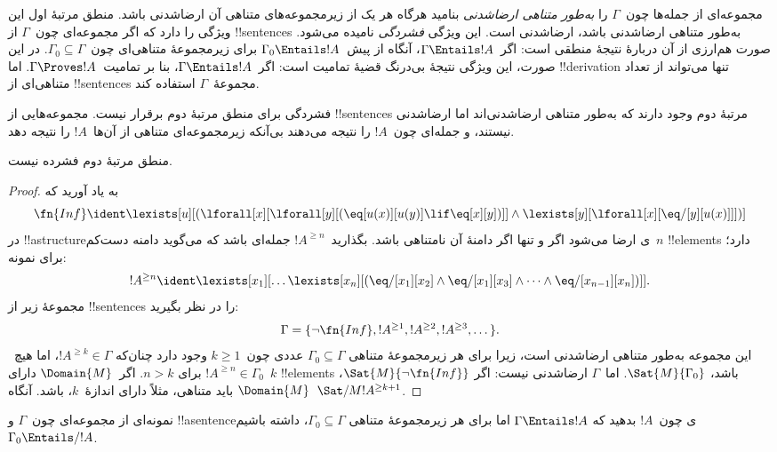 \documentclass[../../../include/open-logic-section]{subfiles}
\begin{document}


\begin{explain}
مجموعه‌ای از جمله‌ها چون~$\Gamma$ را \emph{به‌طور متناهی ارضاشدنی}
بنامید هرگاه هر یک از زیرمجموعه‌های متناهی آن ارضاشدنی باشد. منطق مرتبهٔ
اول این ویژگی را دارد که اگر مجموعه‌ای چون~$\Gamma$ از !!{sentence}s
به‌طور متناهی ارضاشدنی باشد، ارضاشدنی است. این ویژگی
\emph{فشردگی} نامیده می‌شود. صورت هم‌ارزی از آن دربارهٔ نتیجهٔ منطقی
است: اگر~$\Gamma \Entails !A$، آنگاه از پیش~$\Gamma_0 \Entails !A$ برای
زیرمجموعهٔ متناهی‌ای چون~$\Gamma_0 \subseteq \Gamma$. در این صورت،
این ویژگی نتیجهٔ بی‌درنگ قضیهٔ تمامیت است: اگر~$\Gamma \Entails !A$،
بنا بر تمامیت~$\Gamma \Proves !A$. اما !!{derivation} تنها می‌تواند از
تعداد متناهی‌ای از !!{sentence}s مجموعهٔ~$\Gamma$ استفاده کند.

فشردگی برای منطق مرتبهٔ دوم برقرار نیست. مجموعه‌هایی از !!{sentence}s
مرتبهٔ دوم وجود دارند که به‌طور متناهی ارضاشدنی‌اند اما ارضاشدنی نیستند،
و جمله‌ای چون~$!A$ را نتیجه می‌دهند بی‌آنکه زیرمجموعه‌ای متناهی
از آن‌ها~$!A$ را نتیجه دهد.
\end{explain}


\begin{thm}
منطق مرتبهٔ دوم فشرده نیست.
\end{thm}

\begin{proof}
به یاد آورید که
\[
\fn{Inf} \ident \lexists[u][(\lforall[x][\lforall[y][(\eq[u(x)][u(y)]
      \lif \eq[x][y])]] \land \lexists[y][\lforall[x][\eq/[y][u(x)]]])]
\]
در !!a{structure}ی ارضا می‌شود اگر و تنها اگر دامنهٔ آن نامتناهی باشد.
بگذارید~$!A^{\ge n}$ جمله‌ای باشد که می‌گوید دامنه دست‌کم~$n$
!!{element}s دارد؛ برای نمونه:
\[
!A^{\ge n} \ident \lexists[x_1][\dots\lexists[x_n][(\eq/[x_1][x_2]
    \land \eq/[x_1][x_3] \land \dots \land \eq/[x_{n-1}][x_n])]].
\]
مجموعهٔ زیر از !!{sentence}s را در نظر بگیرید:
\[
\Gamma = \{\lnot \fn{Inf}, !A^{\ge 1}, !A^{\ge 2}, !A^{\ge 3}, \dots\}.
\]
این مجموعه به‌طور متناهی ارضاشدنی است، زیرا برای هر زیرمجموعهٔ متناهی
$\Gamma_0 \subseteq \Gamma$ عددی چون~$k \ge 1$ وجود دارد چنان‌که
$!A^{\ge k} \in \Gamma$، اما هیچ~$!A^{\ge n} \in \Gamma_0$ برای
$n>k$. اگر~$\Domain{M}$ دارای~$k$ !!{element}s باشد،
$\Sat{M}{\Gamma_0}$. اما~$\Gamma$ ارضاشدنی نیست: اگر
$\Sat{M}{\lnot \fn{Inf}}$، $\Domain{M}$ باید متناهی، مثلاً دارای
اندازهٔ~$k$، باشد. آنگاه~$\Sat/{M}{!A^{\ge k+1}}$.
\end{proof}

\begin{prob}
نمونه‌ای از مجموعه‌ای چون~$\Gamma$ و !!a{sentence}ی چون~$!A$ بدهید که
$\Gamma \Entails !A$ اما برای هر زیرمجموعهٔ متناهی
$\Gamma_0 \subseteq \Gamma$، داشته باشیم~$\Gamma_0 \Entails/ !A$.
\end{prob}
\end{document}

